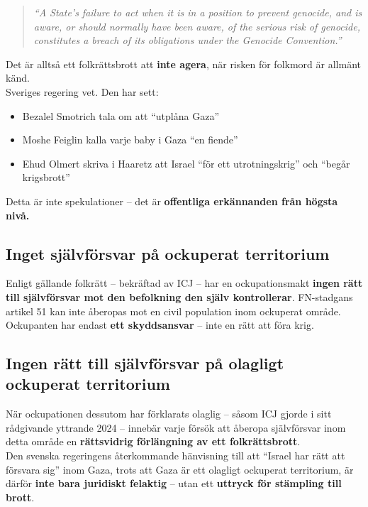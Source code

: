 \begin{quote}
\noindent
\textit{“A State’s failure to act when it is in a position to prevent genocide, and is aware, or should normally have been aware, of the serious risk of genocide, constitutes a breach of its obligations under the Genocide Convention.”}
\end{quote}

\noindent
Det är alltså ett folkrättsbrott att \textbf{inte agera}, när risken för folkmord är allmänt känd.\\

\noindent
Sveriges regering vet. Den har sett:

\begin{itemize}
 \item Bezalel Smotrich tala om att “utplåna Gaza”
 
 \item Moshe Feiglin kalla varje baby i Gaza “en fiende”
 
\item Ehud Olmert skriva i Haaretz att Israel “för ett utrotningskrig” och “begår krigsbrott”
\end{itemize}

\noindent
Detta är inte spekulationer – det är \textbf{offentliga erkännanden från högsta nivå.}

\subsection*{Inget självförsvar på ockuperat territorium}
Enligt gällande folkrätt – bekräftad av ICJ – har en ockupationsmakt \textbf{ingen rätt till självförsvar mot den befolkning den själv kontrollerar}. FN-stadgans artikel 51 kan inte åberopas mot en civil population inom ockuperat område. Ockupanten har endast \textbf{ett skyddsansvar} – inte en rätt att föra krig.

\subsection*{Ingen rätt till självförsvar på olagligt ockuperat territorium}
När ockupationen dessutom har förklarats olaglig – såsom ICJ gjorde i sitt rådgivande yttrande 2024 – innebär varje försök att åberopa självförsvar inom detta område en \textbf{rättsvidrig förlängning av ett folkrättsbrott}.\\

\noindent
Den svenska regeringens återkommande hänvisning till att “Israel har rätt att försvara sig” inom Gaza, trots att Gaza är ett olagligt ockuperat territorium, är därför \textbf{inte bara juridiskt felaktig} – utan ett \textbf{uttryck för stämpling till brott}.\\


